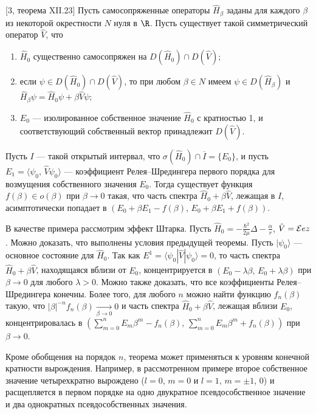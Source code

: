 \documentclass[a4paper
]{article}
\begin{document}
\begin{Trm}
{\rm [3, теорема XII.23]}
Пусть самосопряженные операторы $\hat H_\beta$ заданы для каждого $\beta$
из некоторой окрестности $N$ нуля в $\R$. Пусть существует такой
симметрический оператор $\hat V$, что
\begin{enumerate}
\item $\hat H_0$ существенно самосопряжен на $D(\hat H_0)\cap D(\hat V)$;
\item если $\psi\in D(\hat H_0)\cap D(\hat V)$, то при любом $\beta\in N$
имеем $\psi\in D(\hat H_\beta)$ и $\hat H_\beta\psi=\hat H_0\psi+\beta
\hat V\psi$;
\item $E_0$ --- изолированное собственное значение $\hat H_0$ с кратностью
1, и соответствующий собственный вектор принадлежит $D(\hat V)$.
\end{enumerate}
Пусть $I$ --- такой открытый интервал, что $\sigma(\hat H_0)\cap
\overline I=\{E_0\}$, и пусть $E_1=\langle \psi_0, \, \hat V\psi_0\rangle$
--- коэффициент Релея--Шредингера первого порядка для возмущения
собственного значения $E_0$. Тогда существует функция $f(\beta)\in o(\beta)$
при $\beta\rightarrow 0$ такая, что часть спектра $\hat H_0+\beta \hat V$,
лежащая в $I$, асимптотически попадает в $(E_0+\beta E_1-f(\beta), \,
E_0+\beta E_1+f(\beta))$.
\end{Trm}
В качестве примера рассмотрим эффект Штарка. Пусть $\hat H_0=-\frac{\hbar^2}
{2\mu}\Delta-\frac{\alpha}{r}$, $\hat V={\cal E}ez$. Можно доказать, что
выполнены условия предыдущей теоремы. Пусть $|\psi_0\rangle$ ---
основное состояние для $\hat H_0$. Так как $E^1=\langle \psi_0|\hat V|
\psi_0\rangle=0$, то часть спектра $\hat H_0+\beta \hat V$, находящаяся
вблизи от $E_0$, концентрируется в $(E_0-\lambda \beta, \, E_0+\lambda
\beta)$ при $\beta\rightarrow 0$ для любого $\lambda>0$. Можно также
доказать, что все коэффициенты Релея--Шредингера конечны. Более того,
для любого $n$ можно найти функцию $f_n(\beta)$ такую, что $|\beta|^{-n}
f_n(\beta)\underset{\beta\rightarrow 0}{\rightarrow} 0$ и часть спектра $\hat H_0
+\beta\hat V$, лежащая вблизи $E_0$, концентрировалась в $(\sum \limits
_{m=0}^n E_m\beta^m-f_n(\beta), \, \sum \limits_{m=0}^n E_m\beta^m+f_n
(\beta))$ при $\beta\rightarrow 0$. \par
Кроме обобщения на порядок $n$, теорема может применяться к уровням
конечной кратности вырождения. Например, в рассмотренном примере
второе собственное значение четырехкратно вырождено ($l=0$, $m=0$ и
$l=1$, $m=\pm 1$, $0$) и расщепляется в первом порядке на одно двукратное
псевдособственное значение и два однократных псевдособственных значения.
\end{document}

